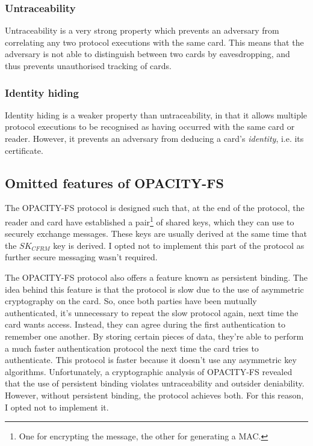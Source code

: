 \documentclass[12pt,a4paper,twoside,openright]{report}
\begin{document}
\subsubsection{Untraceability}

Untraceability is a very strong property which prevents an adversary from correlating any two protocol executions with the same card. This means that the adversary is not able to distinguish between two cards by eavesdropping, and thus prevents unauthorised tracking of cards.

\subsubsection{Identity hiding}

Identity hiding is a weaker property than untraceability, in that it allows multiple protocol executions to be recognised as having occurred with the same card or reader. However, it prevents an adversary from deducing a card's \emph{identity}, i.e. its certificate.

\subsection{Omitted features of OPACITY-FS}
\label{opacityomissions}

The OPACITY-FS protocol is designed such that, at the end of the protocol, the reader and card have established a pair\footnote{One for encrypting the message, the other for generating a MAC.} of shared keys, which they can use to securely exchange messages. These keys are usually derived at the same time that the $SK_{CFRM}$ key is derived. I opted not to implement this part of the protocol as further secure messaging wasn't required.

The OPACITY-FS protocol also offers a feature known as persistent binding. The idea behind this feature is that the protocol is slow due to the use of asymmetric cryptography on the card. So, once both parties have been mutually authenticated, it's unnecessary to repeat the slow protocol again, next time the card wants access. Instead, they can agree during the first authentication to remember one another. By storing certain pieces of data, they're able to perform a much faster authentication protocol the next time the card tries to authenticate. This protocol is faster because it doesn't use any asymmetric key algorithms. Unfortunately, a cryptographic analysis \cite{opacityanalysis} of OPACITY-FS revealed that the use of persistent binding violates untraceability and outsider deniability. However, without persistent binding, the protocol achieves both. For this reason, I opted not to implement it.
\end{document}
